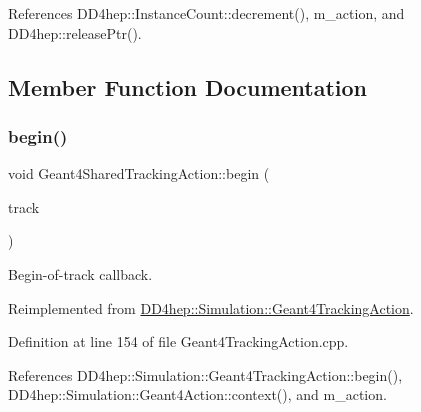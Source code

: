 References D\+D4hep\+::\+Instance\+Count\+::decrement(), m\+\_\+action, and D\+D4hep\+::release\+Ptr().



\subsection{Member Function Documentation}
\hypertarget{class_d_d4hep_1_1_simulation_1_1_geant4_shared_tracking_action_a67db960b642ca48cc171c0d1296e4125}{}\label{class_d_d4hep_1_1_simulation_1_1_geant4_shared_tracking_action_a67db960b642ca48cc171c0d1296e4125} 
\subsubsection{\texorpdfstring{begin()}{begin()}}
{\footnotesize\ttfamily void Geant4\+Shared\+Tracking\+Action\+::begin (\begin{DoxyParamCaption}\item[{const G4\+Track $\ast$}]{track }\end{DoxyParamCaption})\hspace{0.3cm}{\ttfamily [virtual]}}



Begin-\/of-\/track callback. 



Reimplemented from \hyperlink{class_d_d4hep_1_1_simulation_1_1_geant4_tracking_action_a65858867a7b71bf4f48b9f140bc9a88d}{D\+D4hep\+::\+Simulation\+::\+Geant4\+Tracking\+Action}.



Definition at line 154 of file Geant4\+Tracking\+Action.\+cpp.



References D\+D4hep\+::\+Simulation\+::\+Geant4\+Tracking\+Action\+::begin(), D\+D4hep\+::\+Simulation\+::\+Geant4\+Action\+::context(), and m\+\_\+action.

\hypertarget{class_d_d4hep_1_1_simulation_1_1_geant4_shared_tracking_action_a7033aa446a1fbce97cf260caaf55b5b2}{}\label{class_d_d4hep_1_1_simulation_1_1_geant4_shared_tracking_action_a7033aa446a1fbce97cf260caaf55b5b2} 
